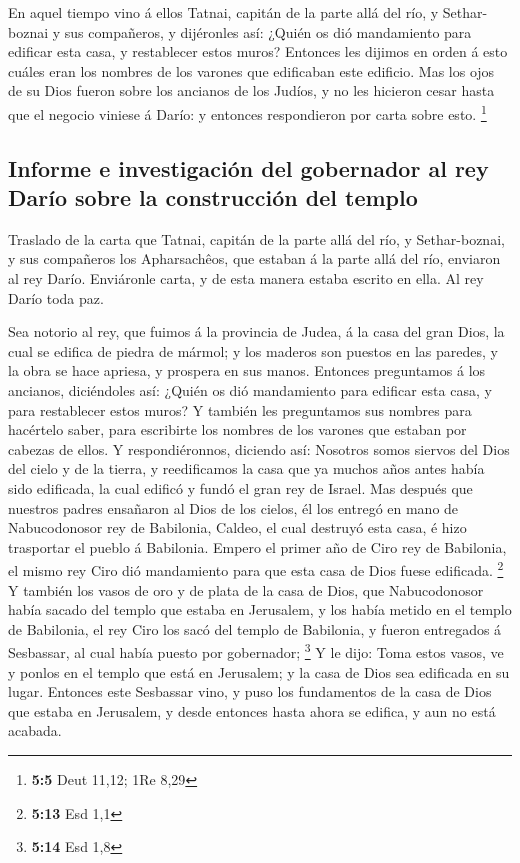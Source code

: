  En aquel tiempo vino á ellos Tatnai, capitán de la parte
allá del río, y Sethar-boznai y sus compañeros, y dijéronles así: ¿Quién
os dió mandamiento para edificar esta casa, y restablecer estos muros?
 Entonces les dijimos en orden á esto cuáles eran los
nombres de los varones que edificaban este edificio.  Mas
los ojos de su Dios fueron sobre los ancianos de los Judíos, y no les
hicieron cesar hasta que el negocio viniese á Darío: y entonces
respondieron por carta sobre esto. \footnote{\textbf{5:5} Deut 11,12;
  1Re 8,29}

\hypertarget{informe-e-investigaciuxf3n-del-gobernador-al-rey-daruxedo-sobre-la-construcciuxf3n-del-templo}{%
\subsection{Informe e investigación del gobernador al rey Darío sobre la
construcción del
templo}\label{informe-e-investigaciuxf3n-del-gobernador-al-rey-daruxedo-sobre-la-construcciuxf3n-del-templo}}

 Traslado de la carta que Tatnai, capitán de la parte allá
del río, y Sethar-boznai, y sus compañeros los Apharsachêos, que estaban
á la parte allá del río, enviaron al rey Darío.  Enviáronle
carta, y de esta manera estaba escrito en ella. Al rey Darío toda paz.

 Sea notorio al rey, que fuimos á la provincia de Judea, á
la casa del gran Dios, la cual se edifica de piedra de mármol; y los
maderos son puestos en las paredes, y la obra se hace apriesa, y
prospera en sus manos.  Entonces preguntamos á los ancianos,
diciéndoles así: ¿Quién os dió mandamiento para edificar esta casa, y
para restablecer estos muros?  Y también les preguntamos
sus nombres para hacértelo saber, para escribirte los nombres de los
varones que estaban por cabezas de ellos.  Y
respondiéronnos, diciendo así: Nosotros somos siervos del Dios del cielo
y de la tierra, y reedificamos la casa que ya muchos años antes había
sido edificada, la cual edificó y fundó el gran rey de Israel.
 Mas después que nuestros padres ensañaron al Dios de los
cielos, él los entregó en mano de Nabucodonosor rey de Babilonia,
Caldeo, el cual destruyó esta casa, é hizo trasportar el pueblo á
Babilonia.  Empero el primer año de Ciro rey de Babilonia,
el mismo rey Ciro dió mandamiento para que esta casa de Dios fuese
edificada. \footnote{\textbf{5:13} Esd 1,1}  Y también los
vasos de oro y de plata de la casa de Dios, que Nabucodonosor había
sacado del templo que estaba en Jerusalem, y los había metido en el
templo de Babilonia, el rey Ciro los sacó del templo de Babilonia, y
fueron entregados á Sesbassar, al cual había puesto por gobernador;
\footnote{\textbf{5:14} Esd 1,8}  Y le dijo: Toma estos
vasos, ve y ponlos en el templo que está en Jerusalem; y la casa de Dios
sea edificada en su lugar.  Entonces este Sesbassar vino, y
puso los fundamentos de la casa de Dios que estaba en Jerusalem, y desde
entonces hasta ahora se edifica, y aun no está acabada.

